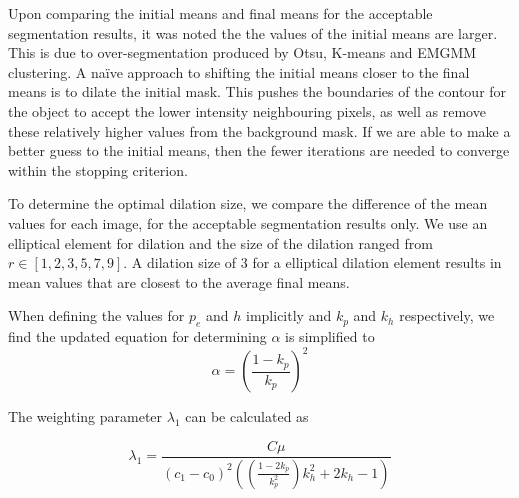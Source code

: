 \documentclass[10pt, journal, letterpaper, onecolumn, draftcls]{IEEEtran}
\begin{document}
Upon comparing the initial means and final means for the acceptable segmentation results, it was noted the the values of the initial means are larger. This is due to over-segmentation produced by Otsu, K-means and EMGMM clustering. A na{\"i}ve approach to shifting the initial means closer to the final means is to dilate the initial mask. This pushes the boundaries of the contour for the object to accept the lower intensity neighbouring pixels, as well as remove these relatively higher values from the background mask. If we are able to make a better guess to the initial means, then the fewer iterations are needed to converge within the stopping criterion.

To determine the optimal dilation size, we compare the difference of the mean values for each image, for the acceptable segmentation results only. We use an elliptical element for dilation and the size of the dilation ranged from $r \in [1, 2, 3, 5 , 7, 9]$. A dilation size of 3 for a elliptical dilation element results in mean values that are closest to the average final means.

When defining the values for $p_e$ and $h$ implicitly and $k_p$ and $k_h$ respectively, we find the updated equation for determining $\alpha$ is simplified to
\begin{equation}
	\alpha = \left( \frac{1-k_p}{k_p} \right)^2
	\label{eq:alphafromkp}
\end{equation}



%

The weighting parameter $\lambda_1$ can be calculated as

\begin{equation}
\lambda_1 = \frac{C\mu}{(c_1-c_0)^2\left( \left( \frac{1-2k_p}{k_p^2} \right)k_h^2 +2k_h -1 \right)}
\label{eq:lambda1fromkpandkh}
\end{equation}
\end{document}

